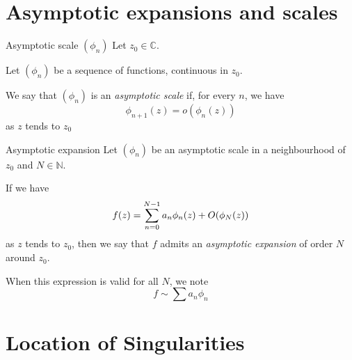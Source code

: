 \documentclass[../main.tex]{subfiles}
\begin{document}
\section{Asymptotic expansions and scales}

\begin{definition}{Asymptotic scale $(\phi_n)$}
	Let $z_0 \in \mathbb{C}$.
	
	Let $(\phi_n)$ be a sequence of functions, continuous in $z_0$.
	
	We say that $(\phi_n)$ is an \emph{asymptotic scale} if, for every $n$, we have
	\[
	\phi_{n + 1}(z) = o(\phi_n(z))
	\]
	as $z$ tends to $z_0$
\end{definition}

\begin{definition}{Asymptotic expansion}
	Let $(\phi_n)$ be an asymptotic scale in a neighbourhood of $z_0$ and $N \in \mathbb{N}$.
	
	If we have
	\[
	f(z) = \sum\limits_{n = 0}^{N-1} a_n \phi_n(z) + O(\phi_N(z))
	\]
	as $z$ tends to $z_0$, then we say that $f$ admits an \emph{asymptotic expansion} of order $N$ around $z_0$.
	
	When this expression is valid for all $N$, we note
	$$
	f \sim \sum a_n \phi_n
	$$
\end{definition}



\section{Location of Singularities}

%
%
%
%
%
%
%
\end{document}
